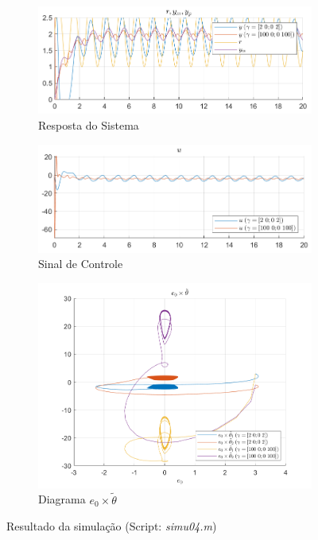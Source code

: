 \documentclass[10pt]{article}
\begin{document}
\begin{figure}[h!]
    \begin{subfigure}[b]{0.35\textwidth}
        \centering
        \includegraphics[width=\textwidth]{img/fig04c.png}
        \caption{Resposta do Sistema}
    \end{subfigure}
    \begin{subfigure}[b]{0.35\textwidth}
        \centering
        \includegraphics[width=\textwidth]{img/fig04e.png}
        \caption{Sinal de Controle}
    \end{subfigure}

    \begin{subfigure}[b]{0.35\textwidth}
        \centering
        \includegraphics[width=\textwidth]{img/fig04d.png}
        \caption{Diagrama $e_0 \times \tilde{\theta}$}
    \end{subfigure}

    \caption{Resultado da simulação (Script: \textit{simu04.m})}
    \label{fig:sim4}
\end{figure}
\end{document}
